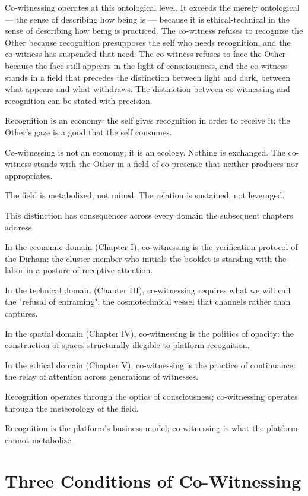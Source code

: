 Co-witnessing operates at this ontological level. It exceeds the merely ontological — the sense of describing how being is — because it is ethical-technical in the sense of describing how being is practiced. The co-witness refuses to recognize the Other because recognition presupposes the self who needs recognition, and the co-witness has suspended that need. The co-witness refuses to face the Other because the face still appears in the light of consciousness, and the co-witness stands in a field that precedes the distinction between light and dark, between what appears and what withdraws. The distinction between co-witnessing and recognition can be stated with precision.

Recognition is an economy: the self gives recognition in order to receive it; the Other's gaze is a good that the self consumes.

Co-witnessing is not an economy; it is an ecology. Nothing is exchanged. The co-witness stands with the Other in a field of co-presence that neither produces nor appropriates.

The field is metabolized, not mined. The relation is sustained, not leveraged.

This distinction has consequences across every domain the subsequent chapters address.

In the economic domain (Chapter I), co-witnessing is the verification protocol of the Dirham: the cluster member who initials the booklet is standing with the labor in a posture of receptive attention.

In the technical domain (Chapter III), co-witnessing requires what we will call the "refusal of enframing": the cosmotechnical vessel that channels rather than captures.

In the spatial domain (Chapter IV), co-witnessing is the politics of opacity: the construction of spaces structurally illegible to platform recognition.

In the ethical domain (Chapter V), co-witnessing is the practice of continuance: the relay of attention across generations of witnesses.

Recognition operates through the optics of consciousness; co-witnessing operates through the meteorology of the field.

Recognition is the platform's business model; co-witnessing is what the platform cannot metabolize.

\section{Three Conditions of Co-Witnessing}

